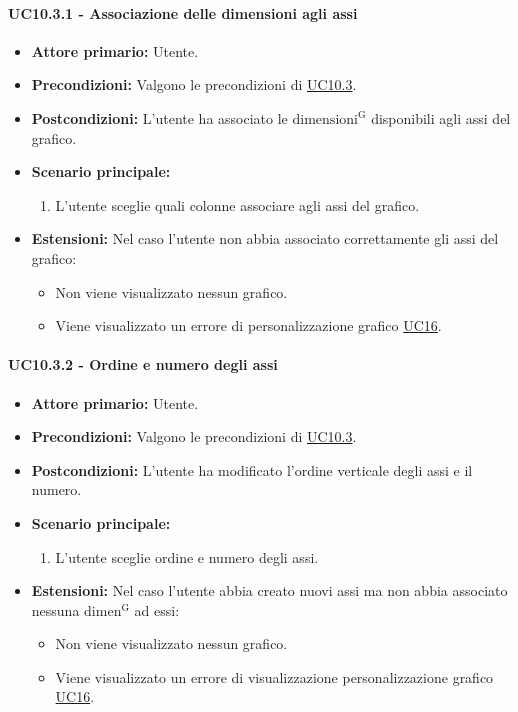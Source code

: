 \paragraph{UC10.3.1 - Associazione delle dimensioni agli assi}
\label{sec:UC10.3.1}
    \begin{itemize}
        \item \textbf{Attore primario:} Utente.
        \item \textbf{Precondizioni:} Valgono le precondizioni di \hyperref[sec:UC10.3]{UC10.3}.
	    \item \textbf{Postcondizioni:} L'utente ha associato le ${\mathrm{dimensioni^{G}}}$ disponibili agli assi del grafico.
	    \item \textbf{Scenario principale:} 
	    \begin{enumerate}
	    		\item L'utente sceglie quali colonne associare agli assi del grafico.
		\end{enumerate}
	    \item \textbf{Estensioni:} Nel caso l'utente non abbia associato correttamente gli assi del grafico:
              \begin{itemize}
                  \item Non viene visualizzato nessun grafico.
                  \item Viene visualizzato un errore di personalizzazione grafico \hyperref[sec:UC16 - Errore di personalizzazione]{UC16}.
              \end{itemize}
    \end{itemize}
    
\paragraph{UC10.3.2 - Ordine e numero degli assi}
\label{sec:UC10.3.2}
    \begin{itemize}
        \item \textbf{Attore primario:} Utente.
        \item \textbf{Precondizioni:} Valgono le precondizioni di \hyperref[sec:UC10.3]{UC10.3}.
	    \item \textbf{Postcondizioni:} L'utente ha modificato l'ordine verticale degli assi e il numero.
	    \item \textbf{Scenario principale:} 
	    \begin{enumerate}
	    		\item L'utente sceglie ordine e numero degli assi.
		\end{enumerate}
	    \item \textbf{Estensioni:} Nel caso l'utente abbia creato nuovi assi ma non abbia associato nessuna ${\mathrm{dimen^{G}}}$ ad essi:
              \begin{itemize}
                  \item Non viene visualizzato nessun grafico.
                  \item Viene visualizzato un errore di visualizzazione personalizzazione grafico \hyperref[sec:UC16 - Errore di personalizzazione]{UC16}.
              \end{itemize}
    \end{itemize}
    

